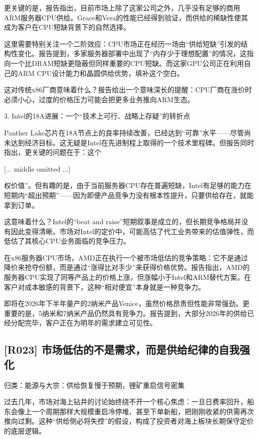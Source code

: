 \documentclass[11pt]{ctexart}
\begin{document}
更关键的是，报告指出，目前市场上除了这家公司之外，几乎没有足够的商用ARM服务器CPU供给。Grace和Vera的性能已经得到验证，而供给的稀缺性使其成为客户在CPU短缺背景下的自然选择。

这里需要特别关注一个二阶效应：CPU市场正在经历一场由“供给短缺”引发的结构性变化。报告提到，多家服务器部署中出现了“内存少于理想配置”的情况，这指向一个比DRAM短缺更隐蔽但同样重要的CPU短缺。而这家GPU公司正在利用自己的ARM CPU设计能力和晶圆供给优势，填补这个空白。

这对传统x86厂商意味着什么？报告给出一个意味深长的提醒：CPU厂商在涨价时必须小心，过度的价格压力可能会把更多业务推向ARM生态。

3. Intel的18A进展：一个“技术上可行、战略上存疑”的转折点

Panther Lake芯片在18A节点上的良率持续改善，已经达到“可靠”水平——尽管尚未达到经济目标。这无疑是Intel在先进制程上取得的一个技术里程碑。但报告同时指出，更关键的问题在于：这个

[... middle omitted ...]

权价值”。但有趣的是，由于当前服务器CPU存在普遍短缺，Intel有足够的能力在短期内“超出预期”——因为即便产品竞争力没有根本性提升，只要供给存在，就能拿到订单。

这意味着什么？Intel的“beat and raise”短期叙事是成立的，但长期竞争格局并没有因此变得清晰。市场对Intel的定价中，可能高估了代工业务带来的估值弹性，而低估了其核心CPU业务面临的竞争压力。

在x86服务器CPU市场，AMD正在执行一个被市场低估的竞争策略：它不是通过降价来抢夺份额，而是通过“涨得比对手少”来获得价格优势。报告指出，AMD的服务器CPU实现了同等产品上的价格上涨，但涨幅小于Intel和ARM替代方案。在客户对成本敏感的背景下，这种“相对便宜”本身就是一种竞争力。

即将在2026年下半年量产的2纳米产品Venice，虽然价格昂贵但性能非常强劲。更重要的是，5纳米和7纳米产品仍然具有竞争力。报告提到，大部分2026年的供给已经分配完毕，客户正在为明年的需求建立可见性。

\subsection{[R023] 市场低估的不是需求，而是供给纪律的自我强化}
{\small\color{refgray}归类：能源与大宗：供给恢复慢于预期，锂矿重启信号密集}

过去几年，市场对海上钻井的讨论始终绕不开一个核心焦虑：一旦日费率回升，船东会像上一个周期那样大规模重启冷停堆、甚至下单新船，把刚刚收紧的供需再次推向过剩。这种“供给侧必将失控”的假设，构成了投资者对海上板块长期保守定价的底层逻辑。
\end{document}
